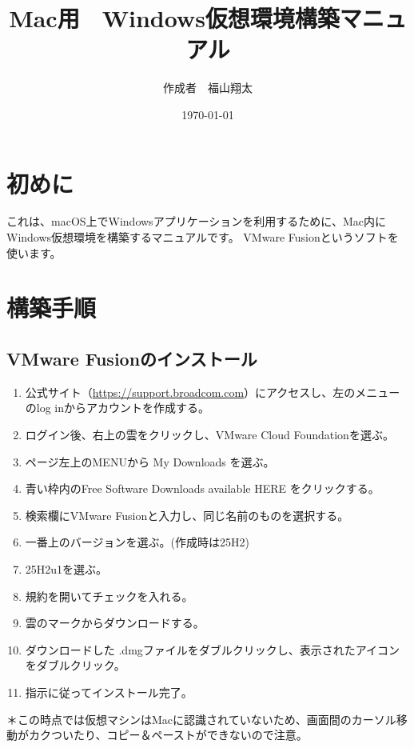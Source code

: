 \documentclass[lualatex,ja=standard]{bxjsarticle}
\title{Mac用　Windows仮想環境構築マニュアル}
\author{作成者　福山翔太}
\date{\today}
\begin{document}
\maketitle
\tableofcontents 
\newpage

\section{初めに}
これは、macOS上でWindowsアプリケーションを利用するために、Mac内にWindows仮想環境を構築するマニュアルです。
VMware Fusionというソフトを使います。

\section{構築手順}
\subsection{VMware Fusionのインストール}
\begin{enumerate}[label=\arabic*.]
    \item 公式サイト（\url{https://support.broadcom.com}）にアクセスし、左のメニューのlog inからアカウントを作成する。
    \item ログイン後、右上の雲をクリックし、VMware Cloud Foundationを選ぶ。
    \item ページ左上のMENUから My Downloads を選ぶ。
    \item 青い枠内のFree Software Downloads available HERE をクリックする。
    \item 検索欄にVMware Fusionと入力し、同じ名前のものを選択する。
    \item 一番上のバージョンを選ぶ。(作成時は25H2)
    \item 25H2u1を選ぶ。
    \item 規約を開いてチェックを入れる。
    \item 雲のマークからダウンロードする。
    \item ダウンロードした .dmgファイルをダブルクリックし、表示されたアイコンをダブルクリック。
    \item 指示に従ってインストール完了。
\end{enumerate}
＊この時点では仮想マシンはMacに認識されていないため、画面間のカーソル移動がカクついたり、コピー＆ペーストができないので注意。
\end{document}
